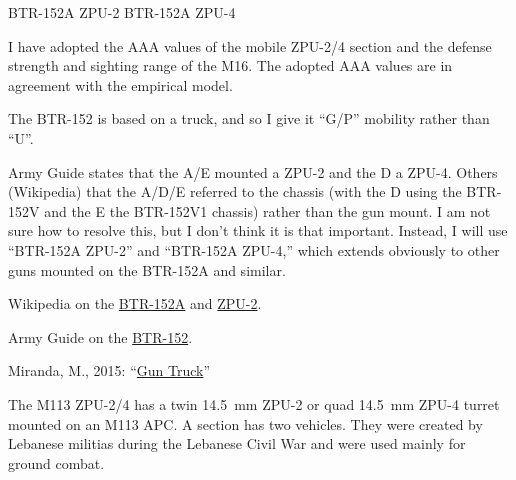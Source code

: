 \begin{withcounters}
{        

        BTR-152A ZPU-2 
        BTR-152A ZPU-4 

        I have adopted the AAA values of the mobile ZPU-2/4 section and the defense strength and sighting range of the M16.
        The adopted AAA values are in agreement with the empirical model.

        The BTR-152 is based on a truck, and so I give it “G/P” mobility rather than “U”.

        Army Guide states that the A/E mounted a ZPU-2 and the D a ZPU-4. Others (Wikipedia) that the A/D/E referred to the chassis (with the D using the BTR-152V and the E the BTR-152V1 chassis) rather than the gun mount. I am not sure how to resolve this, but I don't think it is that important. Instead, I will use “BTR-152A ZPU-2” and “BTR-152A ZPU-4,” which extends obviously to other guns mounted on the BTR-152A and similar.

        \begin{notesources}
            \item Wikipedia on the \href{https://en.wikipedia.org/wiki/BTR-152\#Soviet_Union}{BTR-152A} and \href{https://en.wikipedia.org/wiki/ZPU}{ZPU-2}.
            \item Army Guide on the \href{https://www.army-guide.com/eng/product1120.html}{BTR-152}.
            \item Miranda, M., 2015: “\href{https://thesovietarmourblog.blogspot.com/2015/12/}{Gun Truck}”
        \end{notesources}
    }


    The M113 ZPU-2/4 has a twin 14.5~mm ZPU-2 or quad 14.5~mm ZPU-4 turret mounted on an M113 APC.
    A section has two vehicles.
    They were created by Lebanese militias during the Lebanese Civil War and were used mainly for ground combat.%
\end{withcounters}
